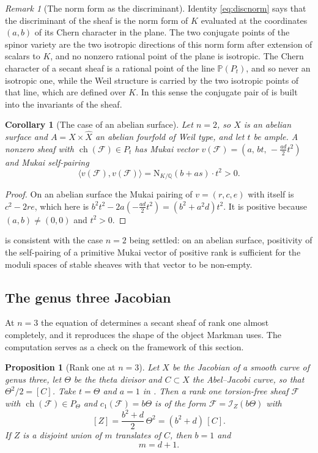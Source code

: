 \documentclass[11pt,reqno]{amsart}
\theoremstyle{plain}
\newtheorem{proposition}[theorem]{Proposition}
\newtheorem{corollary}[theorem]{Corollary}
\theoremstyle{definition}
\theoremstyle{remark}
\newtheorem{remark}[theorem]{Remark}
\newcommand{\QQ}{\mathbb{Q}}
\newcommand{\PP}{\mathbb{P}}
\newcommand{\cF}{\mathcal{F}}
\newcommand{\Nm}{\mathrm{N}}             %
\DeclareMathOperator{\ch}{ch}
\begin{document}
\begin{remark}[The norm form as the discriminant]\label{rem:normdisc}
Identity \eqref{eq:discnorm} says that the discriminant of the sheaf is the
norm form of $K$ evaluated at the coordinates $(a,b)$ of its Chern character
in the plane. The two conjugate points of the spinor variety are the two
isotropic directions of this norm form after extension of scalars to $K$, and
no nonzero rational point of the plane is isotropic. The Chern character of a
secant sheaf is a rational point of the line $\PP(P_{t})$, and so never an
isotropic one, while the Weil structure is carried by the two isotropic points
of that line, which are defined over $K$. In this sense the conjugate pair of
 is built into the invariants of the sheaf.
\end{remark}

\begin{corollary}[The case of an abelian surface]\label{cor:surfacecase}
Let $n=2$, so $X$ is an abelian surface and $A=X\times\widehat{X}$ an abelian
fourfold of Weil type, and let $t$ be ample. A nonzero sheaf with
$\ch(\cF)\in P_{t}$ has Mukai vector
$v(\cF)=(a,\,bt,\,-\tfrac{ad}{2}t^{2})$ and Mukai self-pairing
\[
  \langle v(\cF),v(\cF)\rangle=\Nm_{K/\QQ}(b+as)\cdot t^{2}>0 .
\]
\end{corollary}

\begin{proof}
On an abelian surface the Mukai pairing of $v=(r,c,e)$ with itself is
$c^{2}-2re$, which here is $b^{2}t^{2}-2a(-\tfrac{ad}{2}t^{2})=(b^{2}+a^{2}d)t^{2}$.
It is positive because $(a,b)\ne(0,0)$ and $t^{2}>0$.
\end{proof}

 is consistent with the case $n=2$ being settled: on an
abelian surface, positivity of the self-pairing of a primitive Mukai vector of
positive rank is sufficient for the moduli spaces of stable sheaves with that
vector to be non-empty.

\subsection{The genus three Jacobian}

At $n=3$ the equation of  determines a secant sheaf
of rank one almost completely, and it reproduces the shape of the object
Markman uses. The computation serves as a check on the framework of this
section.

\begin{proposition}[Rank one at $n=3$]\label{prop:genus3}
Let $X$ be the Jacobian of a smooth curve of genus three, let $\Theta$ be the
theta divisor and $C\subset X$ the Abel--Jacobi curve, so that
$\Theta^{2}/2=[C]$. Take $t=\Theta$ and $a=1$ in
. Then a rank one torsion-free sheaf $\cF$ with
$\ch(\cF)\in P_{\Theta}$ and $c_{1}(\cF)=b\Theta$ is of the form
$\cF=\mathcal{I}_{Z}(b\Theta)$ with
\[
  [Z]=\frac{b^{2}+d}{2}\,\Theta^{2}=(b^{2}+d)\,[C].
\]
If $Z$ is a disjoint union of $m$ translates of $C$, then $b=1$ and
\[
  m=d+1 .
\]
\end{proposition}
\end{document}
